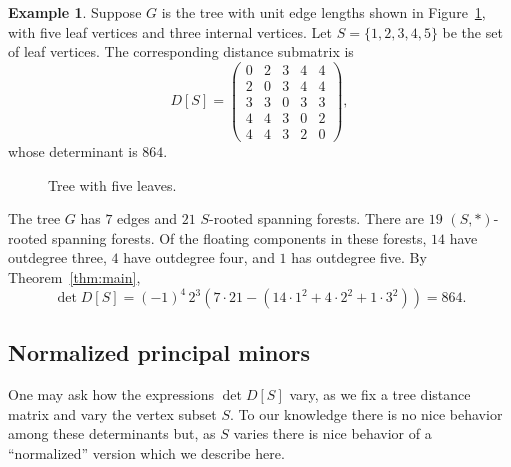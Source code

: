 \documentclass[12pt]{amsart}
\theoremstyle{definition}
\newtheorem*{eg*}{Example}
\begin{document}
\begin{eg*}
Suppose $G$ is the tree with unit edge lengths shown in Figure~\ref{fig:tree-5}, with five leaf vertices and three internal vertices.
Let $S=\{1,2,3,4,5\}$ be the set of leaf vertices. 
The corresponding distance submatrix is
\[
	D[S] = \begin{pmatrix}
	0 & 2 & 3 & 4 & 4 \\
	2 & 0 & 3 & 4 & 4 \\
	3 & 3 & 0 & 3 & 3 \\
	4 & 4 & 3 & 0 & 2 \\
	4 & 4 & 3 & 2 & 0
	\end{pmatrix},
\]
whose determinant is $864$.

\begin{figure}[h]
\centering
{}
\caption{Tree with five leaves.}
\label{fig:tree-5}
\end{figure}

The tree $G$ has $7$ edges and $21$ $S$-rooted spanning forests.
There are $19$ $(S, *)$-rooted spanning forests. 
Of the floating components in these forests, $14$ have outdegree three, $4$ have outdegree four, and $1$ has outdegree five.
By Theorem~\ref{thm:main},
\[
	\det D[S] 
	= (-1)^4\, 2^3 \left( 7 \cdot 21 - (14 \cdot 1^2 + 4 \cdot 2^2 + 1 \cdot 3^2) \right) = 864.
\]
\end{eg*}

\subsection{Normalized principal minors}\label{sec:Normalized principal minors}
One may ask how the expressions $\det D[S]$ vary, as we fix a tree distance matrix and vary the vertex subset $S$.
To our knowledge there is no nice behavior among these determinants but, as $S$ varies there is nice behavior of a ``normalized'' version which we describe here.
\end{document}
